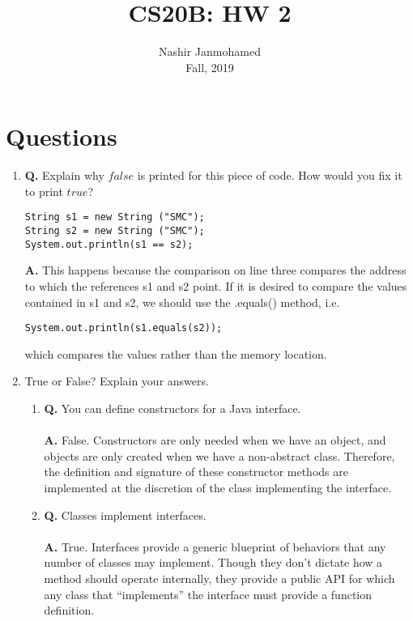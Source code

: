 \documentclass[12pt]{article}
\begin{document}
 
 
\title{CS20B: HW 2}
\author{Nashir Janmohamed\\
Fall, 2019}

\maketitle
\section{Questions}
\begin{enumerate}
  \item
  \textbf{Q.} Explain why $false$ is printed for this piece of code. How would you fix it to print $true$?
  \begin{lstlisting}
String s1 = new String ("SMC");
String s2 = new String ("SMC");
System.out.println(s1 == s2);
  \end{lstlisting}
  \textbf{A.}
  This happens because the comparison on line three compares the address to which the references s1 and s2 point. If it is desired to compare the values contained in s1 and s2, we should use the .equals() method, i.e.
  \begin{lstlisting}
System.out.println(s1.equals(s2));
  \end{lstlisting}
  which compares the values rather than the memory location.
  \item
  True or False? Explain your answers.
  \begin{enumerate}[label=\Alph*]
    \item \textbf{Q.} You can define constructors for a Java interface.
    \\\\
   \textbf{A.}
   False. Constructors are only needed when we have an object, and objects are only created when we have a non-abstract class. Therefore, the definition and signature of these constructor methods are implemented at the discretion of the class implementing the interface.
    \\
    \item \textbf{Q.} Classes implement interfaces.
    \\\\
    \textbf{A.}
    True. Interfaces provide a generic blueprint of behaviors that any number of classes may implement. Though they don't dictate how a method should operate internally, they provide a public API for which any class that ``implements'' the interface must provide a function definition.

\end{enumerate}
\end{enumerate}
\end{document}
